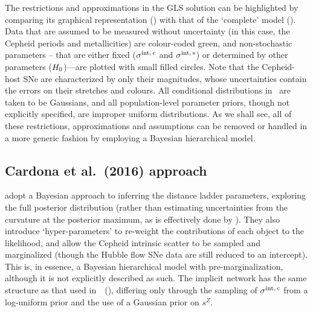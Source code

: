 \documentclass[a4paper,fleqn,usenatbib]{mnras}
\newcommand{\riess}{\citetalias{Riess_etal:2016}}
\newcommand{\slopeZ}{\ensuremath{s^Z}}
\newcommand{\sigintc}{\ensuremath{\sigma^{\rm int,\,c}}}
\newcommand{\sigints}{\ensuremath{\sigma^{\rm int,\,s}}}
\begin{document}
{The restrictions and approximations in the GLS solution can be highlighted by comparing its graphical representation () with that of the `complete' model (). Data that are assumed to be measured without uncertainty (in this case, the Cepheid periods and metallicities) are colour-coded green, and non-stochastic parameters -- that are either fixed ($\sigintc$ and $\sigints$) or determined by other parameters ($H_0$)---are plotted with small filled circles. Note that the Cepheid-host SNe are characterized by only their magnitudes, whose uncertainties contain the errors on their stretches and colours. All conditional distributions in~ are taken to be Gaussians, and all population-level parameter priors, though not explicitly specified, are improper uniform distributions. As we shall see, all of these restrictions, approximations and assumptions can be removed or handled in a more generic fashion by employing a Bayesian hierarchical model.


\subsection{Cardona et al.\ (2016) approach}
\label{section:cardona}

\cite{Cardona_etal:2016} adopt a Bayesian approach to inferring the distance ladder parameters, exploring the full posterior distribution (rather than estimating uncertainties from the curvature at the posterior maximum, as is effectively done by \riess). They also introduce `hyper-parameters' to re-weight the contributions of each object to the likelihood, and allow the Cepheid intrinsic scatter to be sampled and marginalized (though the Hubble flow SNe data are still reduced to an intercept). This is, in essence, a Bayesian hierarchical model with pre-marginalization, although it is not explicitly described as such. The implicit network has the same structure as that used in~\riess\ (), differing only through the sampling of $\sigintc$ from a log-uniform prior and the use of a Gaussian prior on $\slopeZ$.

}
\end{document}
